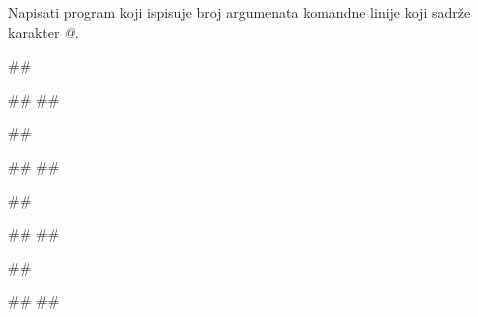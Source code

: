 \begin{Exercise}[label=p2.6_03] 
Napisati program koji ispisuje broj argumenata komandne linije koji sadrže karakter \textit{@}.

\begin{miditest}
\begin{upotreba}{1}
##

#\naslovIzlaz#
##
\end{upotreba}
\end{miditest}
\begin{miditest}
\begin{upotreba}{2}
##

#\naslovIzlaz#
##
\end{upotreba}
\end{miditest}

\begin{miditest}
\begin{upotreba}{3}
##

#\naslovIzlaz#
##
\end{upotreba}
\end{miditest}
\begin{miditest}
\begin{upotreba}{4}
##

#\naslovIzlaz#
##
\end{upotreba}
\end{miditest}


\end{Exercise}
\ifresenja
\begin{Answer}[ref=p2.6_03]
\end{Answer}
 \fi


